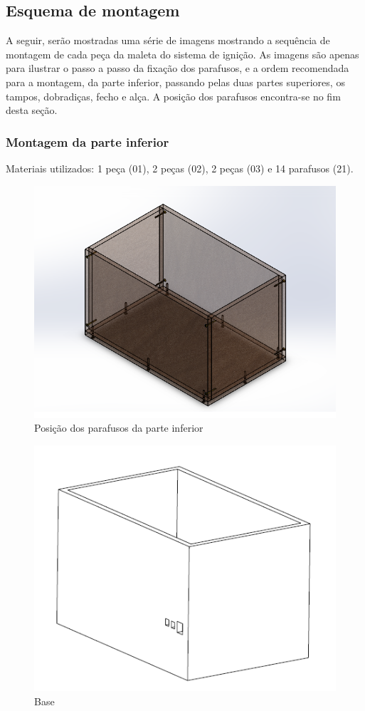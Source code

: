 \subsection{Esquema de montagem}

A seguir, serão mostradas uma série de imagens mostrando a sequência de montagem de cada peça da maleta do sistema de ignição. As imagens são apenas para ilustrar o passo a passo da fixação dos parafusos, e a ordem recomendada para a montagem, da parte inferior, passando pelas duas partes superiores, os tampos, dobradiças, fecho e alça. A posição dos parafusos encontra-se no fim desta seção.

\subsubsection{Montagem da parte inferior}

Materiais utilizados: 1 peça (01), 2 peças (02), 2 peças (03) e 14 parafusos (21).

\begin{figure} [H]
    \centering
    \includegraphics[width=.7\textwidth]{Figuras/montagemMaletasEstrutura/alimentacaoBase.png}
    \caption{Posição dos parafusos da parte inferior}
    \label{fig:alimentacaoBase}
\end{figure}

\begin{figure} [H]
    \centering
    \includegraphics[width=.5\textwidth]{Figuras/suporte/base.png}
    \caption{Base}
\end{figure}

